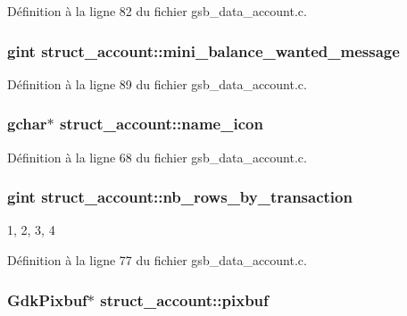 Définition à la ligne 82 du fichier gsb\_\-data\_\-account.c.

\subsubsection[{mini\_\-balance\_\-wanted\_\-message}]{\setlength{\rightskip}{0pt plus 5cm}gint {\bf struct\_\-account::mini\_\-balance\_\-wanted\_\-message}}\label{structstruct__account_a164c91a8f3ea9bbabd958b11065a33fa}


Définition à la ligne 89 du fichier gsb\_\-data\_\-account.c.

\subsubsection[{name\_\-icon}]{\setlength{\rightskip}{0pt plus 5cm}gchar$\ast$ {\bf struct\_\-account::name\_\-icon}}\label{structstruct__account_acb0cd2f1c294e5b9d768e7eecf4ef973}


Définition à la ligne 68 du fichier gsb\_\-data\_\-account.c.

\subsubsection[{nb\_\-rows\_\-by\_\-transaction}]{\setlength{\rightskip}{0pt plus 5cm}gint {\bf struct\_\-account::nb\_\-rows\_\-by\_\-transaction}}\label{structstruct__account_ae293fae42438a9b0068ae9103dc1d8c9}
1, 2, 3, 4 

Définition à la ligne 77 du fichier gsb\_\-data\_\-account.c.

\subsubsection[{pixbuf}]{\setlength{\rightskip}{0pt plus 5cm}GdkPixbuf$\ast$ {\bf struct\_\-account::pixbuf}}\label{structstruct__account_a24a6de6051e804e8654b2b947d2ec8b6}


